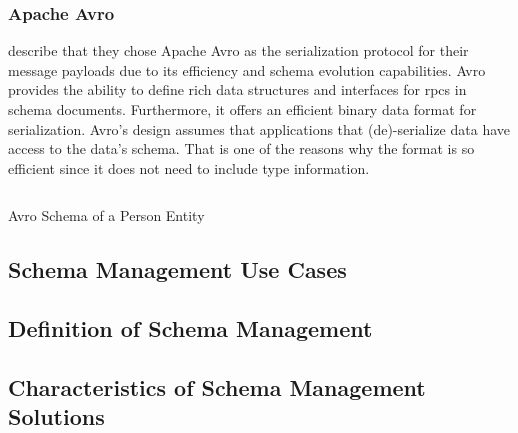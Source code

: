\subsubsection{Apache Avro}

\citeauthor{kreps_kafka_2011} describe that they chose Apache Avro as the serialization protocol for their message payloads due to its efficiency and schema evolution capabilities. 
Avro provides the ability to define rich data structures and interfaces for \glspl{rpc} in schema documents.
Furthermore, it offers an efficient binary data format for serialization.
Avro's design assumes that applications that (de)-serialize data have access to the data's schema.
That is one of the reasons why the format is so efficient since it does not need to include type information.
\parencite{apache_software_foundation_apache_2021}

\begin{listing}[H]
  \inputminted{json}{assets/src/Person.avsc}
  \label{lst:avro-schema-person}
  \caption{Avro Schema of a Person Entity}
\end{listing}


\subsection{Schema Management Use Cases}

\subsection{Definition of Schema Management}

\subsection{Characteristics of Schema Management Solutions}
